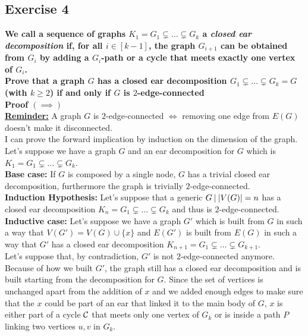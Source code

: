 \subsection*{Exercise 4}
\boldmath\textbf{We call a sequence of graphs $K_1 = G_1 \subsetneq \dots \subsetneq G_k$ a \textit{closed ear decomposition} if, for all $i \in [k - 1]$, the graph $G_{i + 1}$ can be obtained from $G_i$ by adding a $G_i$-path or a cycle that meets exactly one vertex of $G_i$.\\
Prove that a graph $G$ has a closed ear decomposition $G_1 \subsetneq \dots \subsetneq G_k = G$ (with $k \geq 2$) if and only if $G$ is $2$-edge-connected\\
\linebreak
Proof $(\implies)$}\\
\unboldmath
\textbf{\underline{Reminder:}} A graph $G$ is $2$-edge-connected $\iff$ removing one edge from $E(G)$ doesn't make it disconnected.\\
I can prove the forward implication by induction on the dimension of the graph. Let's suppose we have a graph $G$ and an ear decomposition for $G$ which is $K_1 = G_1 \subsetneq \dots \subsetneq G_k$.\\
\linebreak
\textbf{Base case:} If $G$ is composed by a single node, $G$ has a trivial closed ear decomposition, furthermore the graph is trivially $2$-edge-connected.\\
\linebreak
\textbf{Induction Hypothesis:} Let's suppose that a generic $G \:|\: |V(G)| = n$ has a closed ear decomposition $K_n = G_1 \subsetneq \dots \subsetneq G_k$ and thus is $2$-edge-connected.\\
\textbf{Inductive case:} Let's suppose we have a graph $G'$ which is built from $G$ in such a way that $V(G') = V(G) \cup \{x\}$ and $E(G')$ is built from $E(G)$ in such a way that $G'$ has a closed ear decomposition $K_{n + 1} = G_1 \subsetneq \dots \subsetneq G_{k + 1}$.\\
\linebreak
Let's suppose that, by contradiction, $G'$ is not $2$-edge-connected anymore.\\
Because of how we built $G'$, the graph still has a closed ear decomposition and is built starting from the decomposition for $G$. Since the set of vertices is unchanged apart from the addition of $x$ and we added enough edges to make sure that the $x$ could be part of an ear that linked it to the main body of $G$, $x$ is either part of a cycle $\mathcal{C}$ that meets only one vertex of $G_k$ or is inside a path $P$ linking two vertices $u, v$ in $G_k$.
